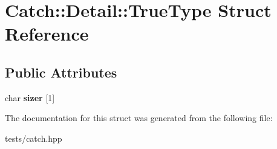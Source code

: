 \hypertarget{struct_catch_1_1_detail_1_1_true_type}{}\section{Catch\+:\+:Detail\+:\+:True\+Type Struct Reference}
\label{struct_catch_1_1_detail_1_1_true_type}
\subsection*{Public Attributes}
\begin{DoxyCompactItemize}
\item 
\mbox{\label{struct_catch_1_1_detail_1_1_true_type_a3aaaeb75909e668b293c8a81f5fb6419}} 
char {\bfseries sizer} \mbox{[}1\mbox{]}
\end{DoxyCompactItemize}


The documentation for this struct was generated from the following file\+:\begin{DoxyCompactItemize}
\item 
tests/catch.\+hpp\end{DoxyCompactItemize}
